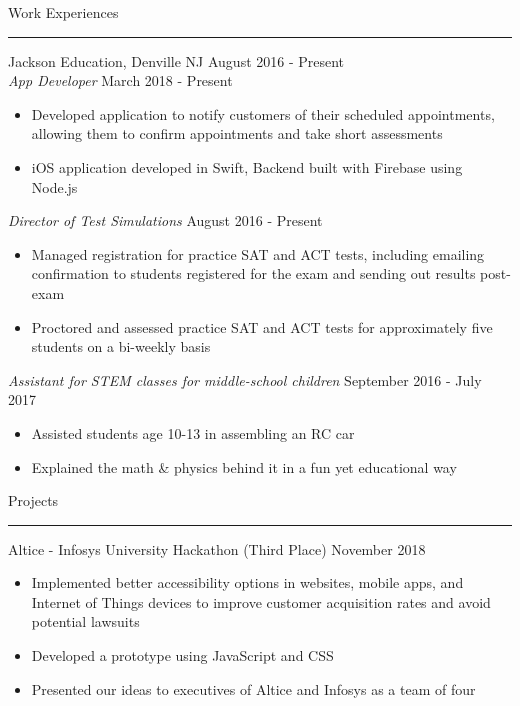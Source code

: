 \documentclass{article}
\newcommand \spacingBetweenHeadings {0.5em}
\begin{document}
\noindent
\huge Work Experiences\par
\vspace{0.1em}
\hrule
\Large
\vspace{1em}
\noindent
Jackson Education, Denville NJ
\hfill
August 2016 - Present\\
\textit{App Developer}
\hfill
March 2018 - Present\\
\vspace{-1em}
\begin{itemize}
\item Developed application to notify customers of their scheduled appointments, allowing them to \mbox{confirm} appointments and take short assessments
\item iOS application developed in Swift, Backend built with Firebase using Node.js
\end{itemize}
\textit{Director of Test Simulations}
\hfill
August 2016 - Present\\
\vspace{-1em}
\begin{itemize}
\item Managed registration for practice SAT and ACT tests, including emailing confirmation to students registered for the exam and sending out results post-exam
\item Proctored and assessed practice SAT and ACT tests for approximately five students on a bi-weekly basis
\end{itemize}
\textit{Assistant for STEM classes for middle-school children}
\hfill
September 2016 - July 2017
\begin{itemize}
\item Assisted students age 10-13 in assembling an RC car
\item Explained the math \& physics behind it in a fun yet educational way
\end{itemize}

\vspace{\spacingBetweenHeadings}

\noindent
\huge Projects\par
\vspace{0.1em}
\hrule
\Large
\vspace{1em}
\noindent
Altice - Infosys University Hackathon (Third Place)
\hfill
November 2018\\
\vspace{-1em}
\begin{itemize}
\item Implemented better accessibility options in websites, mobile apps, and Internet of Things devices to improve customer acquisition rates and avoid potential lawsuits
\item Developed a prototype using JavaScript and CSS
\item Presented our ideas to executives of Altice and Infosys as a team of four
\end{itemize}
\end{document}
